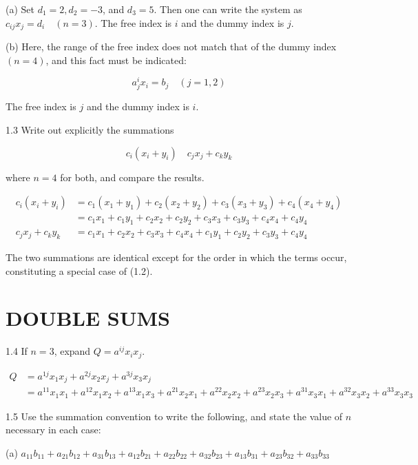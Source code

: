 \documentclass[10pt]{article}
\begin{document}
(a) Set $d_{1}=2, d_{2}=-3$, and $d_{3}=5$. Then one can write the system as $c_{i j} x_{j}=d_{i} \quad(n=3)$. The free index is $i$ and the dummy index is $j$.

(b) Here, the range of the free index does not match that of the dummy index $(n=4)$, and this fact must be indicated:

$$
a_{j}^{i} x_{i}=b_{j} \quad(j=1,2)
$$

The free index is $j$ and the dummy index is $i$.

1.3 Write out explicitly the summations

$$
c_{i}\left(x_{i}+y_{i}\right) \quad c_{j} x_{j}+c_{k} y_{k}
$$

where $n=4$ for both, and compare the results.

$$
\begin{aligned}
c_{i}\left(x_{i}+y_{i}\right) & =c_{1}\left(x_{1}+y_{1}\right)+c_{2}\left(x_{2}+y_{2}\right)+c_{3}\left(x_{3}+y_{3}\right)+c_{4}\left(x_{4}+y_{4}\right) \\
& =c_{1} x_{1}+c_{1} y_{1}+c_{2} x_{2}+c_{2} y_{2}+c_{3} x_{3}+c_{3} y_{3}+c_{4} x_{4}+c_{4} y_{4} \\
c_{j} x_{j}+c_{k} y_{k} & =c_{1} x_{1}+c_{2} x_{2}+c_{3} x_{3}+c_{4} x_{4}+c_{1} y_{1}+c_{2} y_{2}+c_{3} y_{3}+c_{4} y_{4}
\end{aligned}
$$

The two summations are identical except for the order in which the terms occur, constituting a special case of (1.2).

\section*{DOUBLE SUMS}
1.4 If $n=3$, expand $Q=a^{i j} x_{i} x_{j}$.

$$
\begin{aligned}
Q & =a^{1 j} x_{1} x_{j}+a^{2 j} x_{2} x_{j}+a^{3 j} x_{3} x_{j} \\
& =a^{11} x_{1} x_{1}+a^{12} x_{1} x_{2}+a^{13} x_{1} x_{3}+a^{21} x_{2} x_{1}+a^{22} x_{2} x_{2}+a^{23} x_{2} x_{3}+a^{31} x_{3} x_{1}+a^{32} x_{3} x_{2}+a^{33} x_{3} x_{3}
\end{aligned}
$$

1.5 Use the summation convention to write the following, and state the value of $n$ necessary in each case:

(a) $a_{11} b_{11}+a_{21} b_{12}+a_{31} b_{13}+a_{12} b_{21}+a_{22} b_{22}+a_{32} b_{23}+a_{13} b_{31}+a_{23} b_{32}+a_{33} b_{33}$
\end{document}
